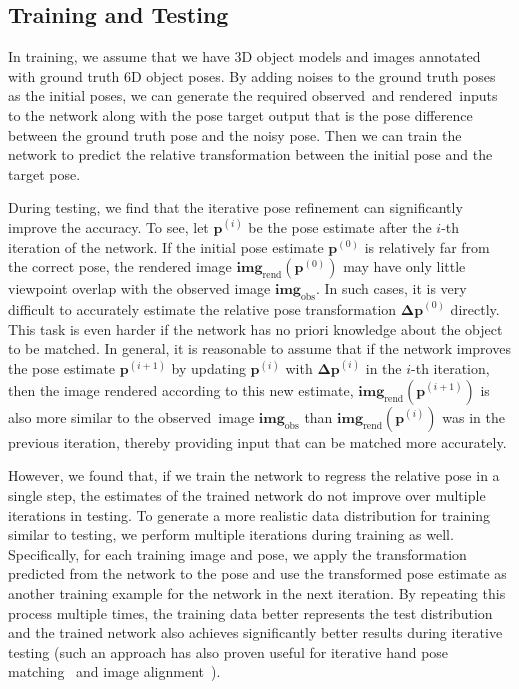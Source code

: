 \documentclass[twocolumn]{svjour3}
\newcommand{\xreal}[0]{\mathbf{img}_{\text{obs}}}
\newcommand{\xrend}[0]{\mathbf{img}_{\text{rend}}}
\newcommand{\rend}[0]{rendered}
\newcommand{\real}[0]{observed}
\newcommand{\pose}[0]{\mathbf{p}}
\newcommand{\ddd}[1]{\textcolor{red}{Dieter:#1}}
\newcommand{\yi}[1]{#1}
\begin{document}

\subsection{Training and Testing}

In training, we assume that we have 3D object models and images annotated with ground truth 6D object poses. By adding noises to the ground truth poses as the initial poses, we can generate the required \real\ and \rend\ inputs to the network along with the pose target output that is the pose difference between the ground truth pose and the noisy pose. Then we can train the network to predict the relative transformation between the initial pose and the target pose.

During testing, we find that the iterative pose refinement can significantly improve the accuracy. To see, let $\pose^{(i)}$ be the pose estimate after the $i$-th iteration of the network. If the initial pose estimate $\pose^{(0)}$ is relatively far from the correct pose, the rendered image $\xrend(\pose^{(0)})$ may have only little viewpoint overlap with the observed image $\xreal$. In such cases, it is very difficult to accurately estimate the relative pose transformation $\mathbf{\Delta p}^{(0)}$ directly. This task is even harder if the network has no priori knowledge about the object to be matched.  
In general, it is reasonable to assume that if the network improves the pose estimate $\mathbf{p}^{(i+1)}$ by updating 
$\mathbf{p}^{(i)}$ with $\mathbf{\Delta p}^{(i)}$ in the $i$-th iteration, then the image rendered according to this new estimate, $\xrend(\mathbf{p}^{(i+1)})$ is also more similar to the \real\ image $\xreal$ than $\xrend(\mathbf{p}^{(i)})$ was in the previous iteration, thereby providing input that can be matched more accurately.

However, we found that, if we train the network to regress the relative pose in a single step, the estimates of the trained network do not improve over multiple iterations in testing.
To generate a more realistic data distribution for training similar to testing, we perform multiple iterations during training as well. Specifically, for each training image and pose, we apply the transformation predicted from the network to the pose and use the transformed pose estimate as another training example for the network in the next iteration. By repeating this process multiple times, the training data better represents the test distribution and the trained network also achieves significantly better results during iterative testing (such an approach has also proven useful for iterative hand pose matching~\citep{oberweger2015tra} \yi{and image alignment~\citep{lin2017inverse}}).
\end{document}
